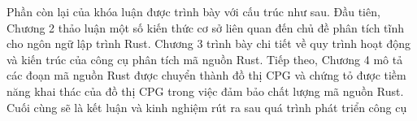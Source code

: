 Phần còn lại của khóa luận được trình bày với cấu trúc như sau.
Đầu tiên, Chương 2 thảo luận một số kiến thức cơ sở liên quan đến chủ đề phân tích tĩnh cho ngôn ngữ lập trình Rust.
Chương 3 trình bày chi tiết về quy trình hoạt động và kiến trúc của công cụ phân tích mã nguồn Rust.
Tiếp theo, Chương 4 mô tả các đoạn mã nguồn Rust được chuyển thành đồ thị CPG và chứng tỏ được tiềm năng khai thác của đồ thị CPG trong việc đảm bảo chất lượng mã nguồn Rust.
Cuối cùng sẽ là kết luận và kinh nghiệm rút ra sau quá trình phát triển công cụ
